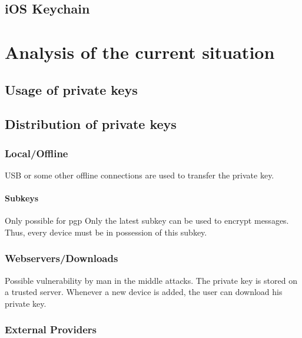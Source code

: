 \documentclass[12pt,twoside,a4paper,parskip]{scrbook}
\begin{document}
\section{iOS Keychain}



\chapter{Analysis of the current situation}

\section{Usage of private keys}

\section{Distribution of private keys}

\subsection{Local/Offline}

USB or some other offline connections are used to transfer the private key.

\subsubsection{Subkeys}

Only possible for pgp
Only the latest subkey can be used to encrypt messages. Thus, every device must be in possession of this subkey. 

\subsection{Webservers/Downloads}

Possible vulnerability by man in the middle attacks.
The private key is stored on a trusted server. Whenever a new device is added, the user can download his private key.

\subsection{External Providers}
\end{document}
